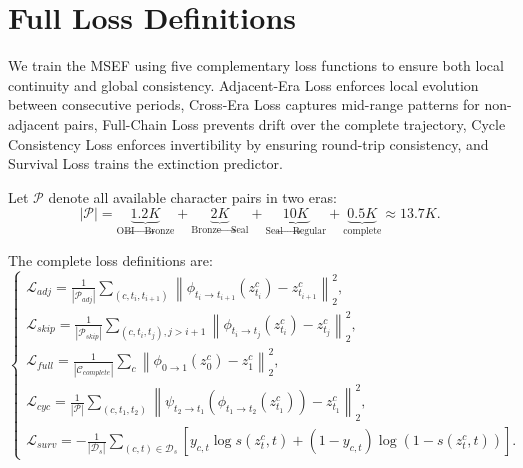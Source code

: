 \documentclass{article}
\begin{document}

\section{Full Loss Definitions}
\label{app:loss}

We train the MSEF using five complementary loss functions to ensure both local continuity and global consistency. 
Adjacent-Era Loss enforces local evolution between consecutive periods, Cross-Era Loss captures mid-range patterns for non-adjacent pairs, Full-Chain Loss prevents drift over the complete trajectory, Cycle Consistency Loss enforces invertibility by ensuring round-trip consistency, and Survival Loss trains the extinction predictor.

Let $\mathcal{P}$ denote all available character pairs in two eras:
\begin{equation}
|\mathcal{P}| =
\underbrace{1.2K}_{\text{OBI}\to\text{Bronze}}
+
\underbrace{2K}_{\text{Bronze}\to\text{Seal}}
+
\underbrace{10K}_{\text{Seal}\to\text{Regular}}
+
\underbrace{0.5K}_{\text{complete}}
\approx 13.7K .
\end{equation}

The complete loss definitions are:
\begin{equation}
\begin{cases}
\mathcal{L}_{adj} =
\frac{1}{|\mathcal{P}_{adj}|}
\sum_{(c,t_i,t_{i+1})}
\left\|
\phi_{t_i\to t_{i+1}}(z^c_{t_i}) - z^c_{t_{i+1}}
\right\|_2^2, \\[0.8em]

\mathcal{L}_{skip} =
\frac{1}{|\mathcal{P}_{skip}|}
\sum_{(c,t_i,t_j),j>i+1}
\left\|
\phi_{t_i\to t_j}(z^c_{t_i}) - z^c_{t_j}
\right\|_2^2, \\[0.8em]

\mathcal{L}_{full} =
\frac{1}{|\mathcal{C}_{complete}|}
\sum_c
\left\|
\phi_{0\to 1}(z^c_0) - z^c_1
\right\|_2^2, \\[0.8em]

\mathcal{L}_{cyc} =
\frac{1}{|\mathcal{P}|}
\sum_{(c,t_1,t_2)}
\left\|
\psi_{t_2\to t_1}
\left(
\phi_{t_1\to t_2}(z^c_{t_1})
\right)
-
z^c_{t_1}
\right\|_2^2, \\[0.8em]

\mathcal{L}_{surv} =
-\frac{1}{|\mathcal{D}_s|}
\sum_{(c,t)\in \mathcal{D}_s}
\left[
y_{c,t}\log s(z^c_t,t)
+
(1-y_{c,t})\log(1-s(z^c_t,t))
\right].
\end{cases}
\label{eq:appendix_all_losses}
\end{equation}
\end{document}
